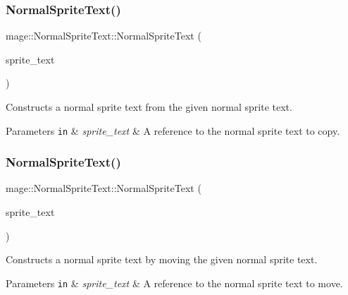\subsubsection{\texorpdfstring{Normal\+Sprite\+Text()}{NormalSpriteText()}\hspace{0.1cm}{\footnotesize\ttfamily [2/3]}}
{\footnotesize\ttfamily mage\+::\+Normal\+Sprite\+Text\+::\+Normal\+Sprite\+Text (\begin{DoxyParamCaption}\item[{const \hyperlink{classmage_1_1_normal_sprite_text}{Normal\+Sprite\+Text} \&}]{sprite\+\_\+text }\end{DoxyParamCaption})\hspace{0.3cm}{\ttfamily [default]}}

Constructs a normal sprite text from the given normal sprite text.


\begin{DoxyParams}[1]{Parameters}
\mbox{\tt in}  & {\em sprite\+\_\+text} & A reference to the normal sprite text to copy. \\
\hline
\end{DoxyParams}
\hypertarget{classmage_1_1_normal_sprite_text_ab2b8232a1bb1aa5294eaa335cb0ccd97}{}\label{classmage_1_1_normal_sprite_text_ab2b8232a1bb1aa5294eaa335cb0ccd97} 
\subsubsection{\texorpdfstring{Normal\+Sprite\+Text()}{NormalSpriteText()}\hspace{0.1cm}{\footnotesize\ttfamily [3/3]}}
{\footnotesize\ttfamily mage\+::\+Normal\+Sprite\+Text\+::\+Normal\+Sprite\+Text (\begin{DoxyParamCaption}\item[{\hyperlink{classmage_1_1_normal_sprite_text}{Normal\+Sprite\+Text} \&\&}]{sprite\+\_\+text }\end{DoxyParamCaption})\hspace{0.3cm}{\ttfamily [default]}}

Constructs a normal sprite text by moving the given normal sprite text.


\begin{DoxyParams}[1]{Parameters}
\mbox{\tt in}  & {\em sprite\+\_\+text} & A reference to the normal sprite text to move. \\
\hline
\end{DoxyParams}
\hypertarget{classmage_1_1_normal_sprite_text_ae8575ab8ece5b8b923509fc7ab4d3dea}{}\label{classmage_1_1_normal_sprite_text_ae8575ab8ece5b8b923509fc7ab4d3dea} 
